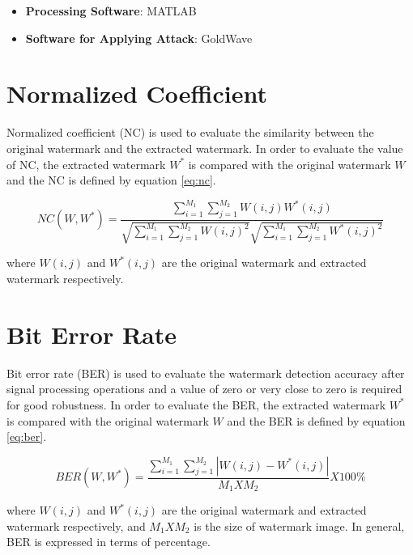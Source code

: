 \documentclass[12pt,a4paper]{report}
\begin{document}
\begin{itemize}
\item \textbf{Processing Software}: MATLAB
\item \textbf{Software for Applying Attack}: GoldWave
\end{itemize}

\section{Normalized Coefficient}

Normalized coefficient (NC) is used to evaluate the similarity between the original watermark and the extracted watermark. In order to evaluate the value of NC, the extracted watermark $W^*$ is compared with the original watermark $W$ and the NC is defined by equation \ref{eq:nc}.

\bigskip

\begin{equation} \label{eq:nc}
NC(W,W^*) = \frac{ \sum_{i=1}^{M_{1}} \sum_{j=1}^{M_{2}} W(i,j)W^*(i,j) } { \sqrt{\sum_{i=1}^{M_{1}} \sum_{j=1}^{M_{2}} W(i,j)^2} \sqrt{\sum_{i=1}^{M_{1}} \sum_{j=1}^{M_{2}} W^*(i,j)^2} }
\end{equation}

\bigskip

where $W(i,j)$ and $W^*(i,j)$ are the original watermark and extracted watermark respectively.

\section{Bit Error Rate}

Bit error rate (BER) is used to evaluate the watermark detection accuracy after signal processing operations and a value of zero or very close to zero is required for good robustness. In order to evaluate the BER, the extracted watermark $W^*$ is compared with the original watermark $W$ and the BER is defined by equation \ref{eq:ber}.

\bigskip

\begin{equation} \label{eq:ber}
BER(W,W^*) = \frac{ \sum_{i=1}^{M_{1}} \sum_{j=1}^{M_{2}} |W(i,j) - W^*(i,j)| } { M_1 X M_2 } X 100\%
\end{equation}

\bigskip

where $W(i,j)$ and $W^*(i,j)$ are the original watermark and extracted watermark respectively, and $M_{1}XM_{2}$ is the size of watermark image. In general, BER is expressed in terms of percentage.
\end{document}
